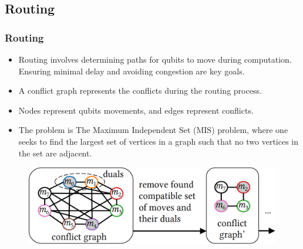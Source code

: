 \documentclass[18 pt]{beamer}
\begin{document}
\subsection{Routing}
\begin{frame}
    \frametitle{Routing}
    \begin{itemize}
        \item Routing involves determining paths for qubits to move during computation. Ensuring minimal delay and avoiding congestion are key goals.
        \item A conflict graph represents the conflicts during the routing process.
        \item Nodes represent qubits movements, and edges represent conflicts.
        \item The problem is The Maximum Independent Set (MIS) problem, where one seeks to find the largest set of vertices in a graph such that no two vertices in the set are adjacent.
    \end{itemize}
    \begin{figure}
        \includegraphics[height=3.5cm]{conflict.png}
    \end{figure}
\end{frame}
\end{document}
